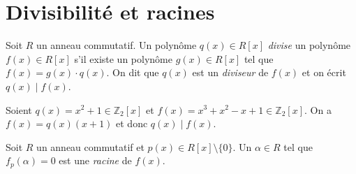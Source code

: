 


        
            
        
        


\section{Divisibilité et racines}
\label{sec:divis-et-racin}

\begin{definition}
  \label{def:32}
  Soit $R$ un anneau commutatif. 
  Un polynôme  $q(x) ∈R[x]$ \emph{divise} un  polynôme $f(x)∈ R[x]$ s'il existe un polynôme $g(x)∈ R[x]$ tel que $f(x) = g(x) \cdot q(x)$. On dit que $q(x)$ est un \emph{diviseur} de $f(x)$ et on écrit $q(x) \mid f(x)$. 
\end{definition}


\begin{example}
  \label{exe:41}
  Soient $q(x) = x^2 +1 ∈ℤ_2[x]$ et $ f(x) = x^3 + x^2 - x+1 ∈ ℤ_2[x]$. On a
  $f(x) = q(x) (x+1)$ et donc 
   $q(x) \mid f(x)$. 
\end{example}


\begin{definition}
  \label{def:31}
  Soit $R$ un anneau commutatif et 
  $p(x) \in R[x] \setminus\{0\}$. Un $\alpha \in R$ tel que $f_p(\alpha) = 0$ est une  \emph{racine} de $f(x)$.  
\end{definition}


